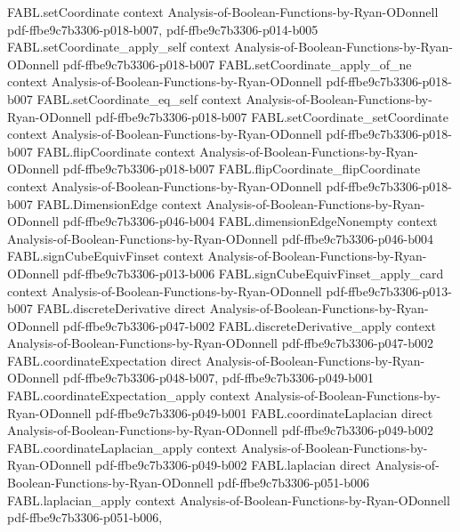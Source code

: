 \begin{theorem}
  {FABL.setCoordinate}
  {context}
  {Analysis-of-Boolean-Functions-by-Ryan-ODonnell}
  {pdf-ffbe9c7b3306-p018-b007,
    pdf-ffbe9c7b3306-p014-b005}
\proofstep
  {FABL.setCoordinate_apply_self}
  {context}
  {Analysis-of-Boolean-Functions-by-Ryan-ODonnell}
  {pdf-ffbe9c7b3306-p018-b007}
\proofstep
  {FABL.setCoordinate_apply_of_ne}
  {context}
  {Analysis-of-Boolean-Functions-by-Ryan-ODonnell}
  {pdf-ffbe9c7b3306-p018-b007}
\proofstep
  {FABL.setCoordinate_eq_self}
  {context}
  {Analysis-of-Boolean-Functions-by-Ryan-ODonnell}
  {pdf-ffbe9c7b3306-p018-b007}
\proofstep
  {FABL.setCoordinate_setCoordinate}
  {context}
  {Analysis-of-Boolean-Functions-by-Ryan-ODonnell}
  {pdf-ffbe9c7b3306-p018-b007}
\proofstep
  {FABL.flipCoordinate}
  {context}
  {Analysis-of-Boolean-Functions-by-Ryan-ODonnell}
  {pdf-ffbe9c7b3306-p018-b007}
\proofstep
  {FABL.flipCoordinate_flipCoordinate}
  {context}
  {Analysis-of-Boolean-Functions-by-Ryan-ODonnell}
  {pdf-ffbe9c7b3306-p018-b007}
\proofstep
  {FABL.DimensionEdge}
  {context}
  {Analysis-of-Boolean-Functions-by-Ryan-ODonnell}
  {pdf-ffbe9c7b3306-p046-b004}
\proofstep
  {FABL.dimensionEdgeNonempty}
  {context}
  {Analysis-of-Boolean-Functions-by-Ryan-ODonnell}
  {pdf-ffbe9c7b3306-p046-b004}
\proofstep
  {FABL.signCubeEquivFinset}
  {context}
  {Analysis-of-Boolean-Functions-by-Ryan-ODonnell}
  {pdf-ffbe9c7b3306-p013-b006}
\proofstep
  {FABL.signCubeEquivFinset_apply_card}
  {context}
  {Analysis-of-Boolean-Functions-by-Ryan-ODonnell}
  {pdf-ffbe9c7b3306-p013-b007}
\proofstep
  {FABL.discreteDerivative}
  {direct}
  {Analysis-of-Boolean-Functions-by-Ryan-ODonnell}
  {pdf-ffbe9c7b3306-p047-b002}
\proofstep
  {FABL.discreteDerivative_apply}
  {context}
  {Analysis-of-Boolean-Functions-by-Ryan-ODonnell}
  {pdf-ffbe9c7b3306-p047-b002}
\proofstep
  {FABL.coordinateExpectation}
  {direct}
  {Analysis-of-Boolean-Functions-by-Ryan-ODonnell}
  {pdf-ffbe9c7b3306-p048-b007,
    pdf-ffbe9c7b3306-p049-b001}
\proofstep
  {FABL.coordinateExpectation_apply}
  {context}
  {Analysis-of-Boolean-Functions-by-Ryan-ODonnell}
  {pdf-ffbe9c7b3306-p049-b001}
\proofstep
  {FABL.coordinateLaplacian}
  {direct}
  {Analysis-of-Boolean-Functions-by-Ryan-ODonnell}
  {pdf-ffbe9c7b3306-p049-b002}
\proofstep
  {FABL.coordinateLaplacian_apply}
  {context}
  {Analysis-of-Boolean-Functions-by-Ryan-ODonnell}
  {pdf-ffbe9c7b3306-p049-b002}
\proofstep
  {FABL.laplacian}
  {direct}
  {Analysis-of-Boolean-Functions-by-Ryan-ODonnell}
  {pdf-ffbe9c7b3306-p051-b006}
\proofstep
  {FABL.laplacian_apply}
  {context}
  {Analysis-of-Boolean-Functions-by-Ryan-ODonnell}
  {pdf-ffbe9c7b3306-p051-b006,
}
\end{theorem}
